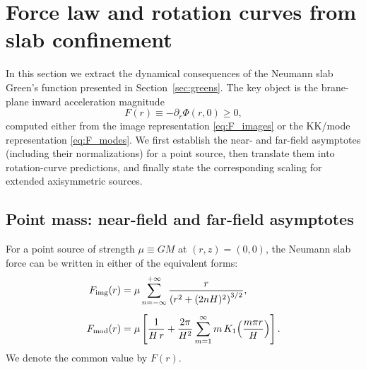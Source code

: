 \documentclass[11pt]{article}
\begin{document}
\section{Force law and rotation curves from slab confinement}
\label{sec:asymptotics_rotation}

In this section we extract the dynamical consequences of the Neumann slab Green's function presented
in Section~\ref{sec:greens}.  The key object is the brane-plane inward acceleration magnitude
\begin{equation}
  F(r)\equiv -\partial_r\Phi(r,0)\ge 0,
\end{equation}
computed either from the image representation \eqref{eq:F_images} or the KK/mode representation
\eqref{eq:F_modes}.  We first establish the near- and far-field asymptotes (including their
normalizations) for a point source, then translate them into rotation-curve predictions, and finally
state the corresponding scaling for extended axisymmetric sources.

\subsection{Point mass: near-field and far-field asymptotes}
\label{sec:point_asymptotes}

For a point source of strength $\mu\equiv GM$ at $(r,z)=(0,0)$, the Neumann slab force can be written
in either of the equivalent forms:
\begin{align}
  F_{\rm img}(r)
  &= \mu\sum_{n=-\infty}^{+\infty}
  \frac{r}{\left(r^2+(2nH)^2\right)^{3/2}},
  \label{eq:dyn_F_images}\\[4pt]
  F_{\rm mod}(r)
  &= \mu\left[
    \frac{1}{H\,r}
    + \frac{2\pi}{H^2}\sum_{m=1}^{\infty}
      m\,K_1\!\left(\frac{m\pi r}{H}\right)
  \right].
  \label{eq:dyn_F_modes}
\end{align}
We denote the common value by $F(r)$.
\end{document}
